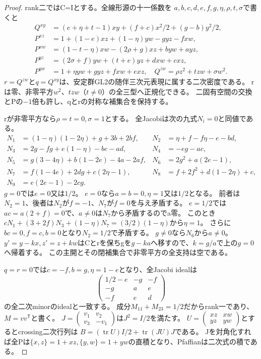 \documentclass[a4paper,11pt]{ltjsarticle}
\theoremstyle{definition}
\begin{document}
\begin{proof}
rank二ではC=Iとする。全線形源の十一係数を
$a,b,c,d,e,f,g,\eta,\rho,t,\sigma$で書くと
\[
\begin{aligned}
 Q^{xy}&=(e+\eta+t-1)xy+(f+c)x^2/2+(g-b)y^2/2,\\
 P^{xz}&=1+(1-e)xz+(1-\eta)yw-gyz-fxw,\\
 P^{xw}&=(1-t-\eta)xw-(2\rho+g)xz+byw+ayz,\\
 P^{yz}&=(2\sigma+f)yw+(t+e)yz+dxw+cxz,\\
 P^{yw}&=1+\eta yw+gyz+fxw+exz,\quad
 Q^{zw}=\rho z^2+tzw+\sigma w^2.
\end{aligned}
\]
$r=Q^{zw}$と$q=Q^{xy}$は、安定群GL2の随伴三次元表現に属する二次密度である。
rは零、非零平方$w^2$、$tzw$（$t\ne0$）の全三型へ正規化できる。
二固有空間の交換とPの$-1$倍も許し、qとrの対称な補集合を保持する。

rが非零平方なら$\rho=t=0,\sigma=1$とする。
全Jacobiは次の九式$N_i=0$と同値である。
\[
\begin{aligned}
 N_1&=(1-\eta)(1-2\eta)+g+3b+2bf,&
 N_2&=\eta+f-f\eta-e-bd,\\
 N_3&=2g-fg+e(1-\eta)-bc-ad,&N_4&=-eg-ac,\\
 N_5&=g(3-4\eta)+b(1-2e)-4a-2af,&N_6&=2g^2+a(2e-1),\\
 N_7&=f(1-4e)+2dg+c(2\eta-1),&N_8&=f+2f^2+d(1-2\eta)+c,\\
 N_9&=e(2e-1)-2cg.
\end{aligned}
\]
$g=0$では$e=0$又は$1/2$。
$e=0$なら$a=b=0,\eta=1$又は$1/2$となる。
前者は$N_2=1$、後者は$N_2$が$f=-1$、$N_7$が$f=0$を与え矛盾する。
$e=1/2$では$ac=a(2+f)=0$で、$a\ne0$は$N_7$から矛盾するのでa零。
このとき
$cN_1+(3+2f)N_3+(1-\eta)N_7=(3/2)(1-\eta)$から$\eta=1$。
さらに$bc=0,f=c,b=0$となり$N_2=1/2$で矛盾する。
$g\ne0$なら$N_6$から$a\ne0$。
$y'=y-kx,z'=z+kw$はCとrを保ちgを$g-ka$へ移すので、$k=g/a$で上の$g=0$へ帰着する。
この主開とその閉補集合で非零平方の全支持は空である。

$q=r=0$では$c=-f,b=g,\eta=1-e$となり、全Jacobi idealは
\[
 \begin{pmatrix}1/2-e&-g&-f\\-g&a&e\\-f&e&d\end{pmatrix}
\]
の全二次minorのidealと一致する。
成分$M_{11}+M_{23}=1/2$だからrank一であり、$M=vv^{\mathsf T}$と書く。
$J=\left(\begin{smallmatrix}v_1&v_2\\v_3&-v_1\end{smallmatrix}\right)$は$J^2=I/2$を満たす。
$U=\left(\begin{smallmatrix}xz&xw\\yz&yw\end{smallmatrix}\right)$とするとcrossing二次行列は
$B=(\operatorname{tr}U)I/2+\operatorname{tr}(JU)J$である。
Jを対角化すれば全Pは$\{x,z\}=1+xz,\{y,w\}=1+yw$の直積となり、Pfaffianは二次式の積である。


\end{proof}
\end{document}

